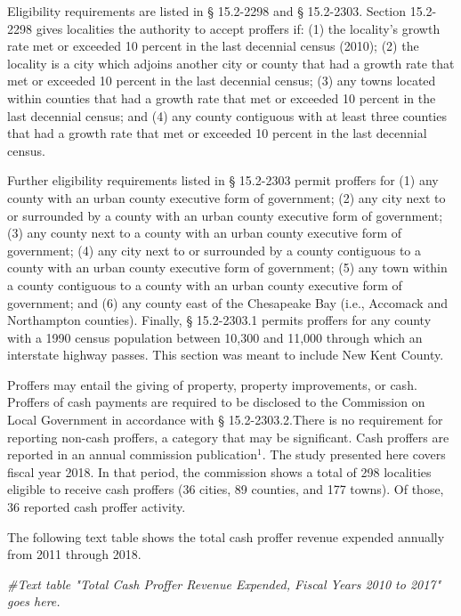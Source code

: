 \documentclass[
]{book}
\newenvironment{Shaded}{\begin{snugshade}}{\end{snugshade}}
\newcommand{\CommentTok}[1]{\textcolor[rgb]{0.56,0.35,0.01}{\textit{#1}}}
\begin{document}
Eligibility requirements are listed in § 15.2-2298 and § 15.2-2303. Section 15.2-2298 gives localities the authority to accept proffers if: (1) the locality's growth rate met or exceeded 10 percent in the last decennial census (2010); (2) the locality is a city which adjoins another city or county that had a growth rate that met or exceeded 10 percent in the last decennial census; (3) any towns located within counties that had a growth rate that met or exceeded 10 percent in the last decennial census; and (4) any county contiguous with at least three counties that had a growth rate that met or exceeded 10 percent in the last decennial census.

Further eligibility requirements listed in § 15.2-2303 permit proffers for (1) any county with an urban county executive form of government; (2) any city next to or surrounded by a county with an urban county executive form of government; (3) any county next to a county with an urban county executive form of government; (4) any city next to or surrounded by a county contiguous to a county with an urban county executive form of government; (5) any town within a county contiguous to a county with an urban county executive form of government; and (6) any county east of the Chesapeake Bay (i.e., Accomack and Northampton counties). Finally, § 15.2-2303.1 permits proffers for any county with a 1990 census population between 10,300 and 11,000 through which an interstate highway passes. This section was meant to include New Kent County.

Proffers may entail the giving of property, property improvements, or cash. Proffers of cash payments are required to be disclosed to the Commission on Local Government in accordance with § 15.2-2303.2.There is no requirement for reporting non-cash proffers, a category that may be significant. Cash proffers are reported in an annual commission publication\(^1\). The study presented here covers fiscal year 2018. In that period, the commission shows a total of 298 localities eligible to receive cash proffers (36 cities, 89 counties, and 177 towns). Of those, 36 reported cash proffer activity.

The following text table shows the total cash proffer revenue expended annually from 2011 through 2018.

\begin{Shaded}
\begin{Highlighting}[]
\CommentTok{\#Text table "Total Cash Proffer Revenue Expended, Fiscal Years 2010 to 2017" goes here.}
\end{Highlighting}
\end{Shaded}
\end{document}
